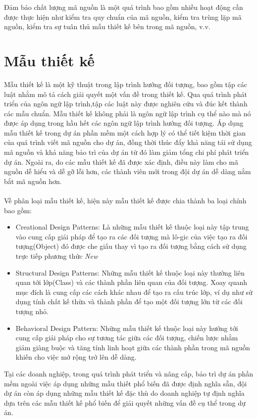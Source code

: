 \documentclass[12pt]{report}
\begin{document}
\noindent Đảm bảo chất lượng mã nguồn là một quá trình bao gồm nhiều hoạt động cần được thực hiện như kiểm tra quy chuẩn của mã nguồn, kiểm tra trùng lặp mã nguồn, kiểm tra sự tuân thủ mẫu thiết kế bên trong mã nguồn, v.v.
\section{Mẫu thiết kế}
Mẫu thiết kế \cite{go4} là một kỹ thuật trong lập trình hướng đối tượng, bao gồm tập các luật nhằm mô tả cách giải quyết một vấn đề trong thiết kế. Qua quá trình phát triển của ngôn ngữ lập trình,tập các luật này được nghiên cứu và đúc kết thành các mẫu chuẩn. Mẫu thiết kế không phải là ngôn ngữ lập trình cụ thể nào mà nó được áp dụng trong hầu hết các ngôn ngữ lập trình hướng đối tượng.
Áp dụng mẫu thiết kế trong dự án phần mềm một cách hợp lý có thể tiết kiệm thời gian của quá trình viết mã nguồn cho dự án, đồng thời thúc đẩy khả năng tái sử dụng mã nguồn và khả năng bảo trì của dự án từ đó làm giảm tổng chi phí phát triển dự án. Ngoài ra, do các mẫu thiết kế đã được xác định, điều này làm cho mã nguồn dễ hiểu và dễ gỡ lỗi hơn, các thành viên mới trong đội dự án dễ dàng nắm bắt mã nguồn hơn.
\\\\
Về phân loại mẫu thiết kế, hiện này mẫu thiết kế được chia thành ba loại chính bao gồm:
\begin{itemize}
	\item Creational Design Patterns: Là những mẫu thiết kế thuộc loại này tập trung vào cung cấp giải pháp để tạo ra các đối tượng mà lô-gic của việc tạo ra đối tượng(Object) đó được che giấu thay vì tạo ra đối tượng bằng cách sử dụng trực tiếp phương thức \textit{New}
	\item Structural Design Patterns: Những mẫu thiết kế thuộc loại này thường liên quan tới lớp(Class) và các thành phần liên quan của đối tượng. Xoay quanh mục đích là cung cấp các cách khác nhau để tạo ra cấu trúc lớp, ví dụ như sử dụng tính chất kế thừa và thành phần để tạo một đối tượng lớn từ các đối tượng nhỏ.
	\item Behavioral Design Pattern: Những mẫu thiết kế thuộc loại này hướng tới cung cấp giải pháp cho sự tương tác giữa các đối tượng, chiến lược nhằm giảm giàng buộc và tăng tính linh hoạt giữa các thành phần trong mã nguồn khiến cho việc mở rộng trở lên dễ dàng.
\end{itemize}
Tại các doanh nghiệp, trong quá trình phát triển và nâng cấp, bảo trì dự án phần mềm ngoài việc áp dụng những mẫu thiết phổ biến đã được định nghĩa sẵn, đội dự án còn áp dụng những mẫu thiết kế đặc thù do doanh nghiệp tự định nghĩa dựa trên các mẫu thiết kế phổ biến để giải quyết những vấn đề cụ thể trong dự án.
\end{document}
